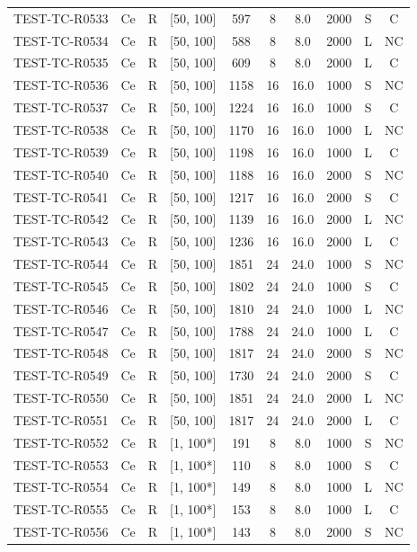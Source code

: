 \begin{longtable}{lccccccccc}
TEST-TC-R0533 & Ce & R & [50, 100] & 597 & 8 & 8.0 & 2000 & S & C \\
TEST-TC-R0534 & Ce & R & [50, 100] & 588 & 8 & 8.0 & 2000 & L & NC \\
TEST-TC-R0535 & Ce & R & [50, 100] & 609 & 8 & 8.0 & 2000 & L & C \\
TEST-TC-R0536 & Ce & R & [50, 100] & 1158 & 16 & 16.0 & 1000 & S & NC \\
TEST-TC-R0537 & Ce & R & [50, 100] & 1224 & 16 & 16.0 & 1000 & S & C \\
TEST-TC-R0538 & Ce & R & [50, 100] & 1170 & 16 & 16.0 & 1000 & L & NC \\
TEST-TC-R0539 & Ce & R & [50, 100] & 1198 & 16 & 16.0 & 1000 & L & C \\
TEST-TC-R0540 & Ce & R & [50, 100] & 1188 & 16 & 16.0 & 2000 & S & NC \\
TEST-TC-R0541 & Ce & R & [50, 100] & 1217 & 16 & 16.0 & 2000 & S & C \\
TEST-TC-R0542 & Ce & R & [50, 100] & 1139 & 16 & 16.0 & 2000 & L & NC \\
TEST-TC-R0543 & Ce & R & [50, 100] & 1236 & 16 & 16.0 & 2000 & L & C \\
TEST-TC-R0544 & Ce & R & [50, 100] & 1851 & 24 & 24.0 & 1000 & S & NC \\
TEST-TC-R0545 & Ce & R & [50, 100] & 1802 & 24 & 24.0 & 1000 & S & C \\
TEST-TC-R0546 & Ce & R & [50, 100] & 1810 & 24 & 24.0 & 1000 & L & NC \\
TEST-TC-R0547 & Ce & R & [50, 100] & 1788 & 24 & 24.0 & 1000 & L & C \\
TEST-TC-R0548 & Ce & R & [50, 100] & 1817 & 24 & 24.0 & 2000 & S & NC \\
TEST-TC-R0549 & Ce & R & [50, 100] & 1730 & 24 & 24.0 & 2000 & S & C \\
TEST-TC-R0550 & Ce & R & [50, 100] & 1851 & 24 & 24.0 & 2000 & L & NC \\
TEST-TC-R0551 & Ce & R & [50, 100] & 1817 & 24 & 24.0 & 2000 & L & C \\
TEST-TC-R0552 & Ce & R & [1, 100*] & 191 & 8 & 8.0 & 1000 & S & NC \\
TEST-TC-R0553 & Ce & R & [1, 100*] & 110 & 8 & 8.0 & 1000 & S & C \\
TEST-TC-R0554 & Ce & R & [1, 100*] & 149 & 8 & 8.0 & 1000 & L & NC \\
TEST-TC-R0555 & Ce & R & [1, 100*] & 153 & 8 & 8.0 & 1000 & L & C \\
TEST-TC-R0556 & Ce & R & [1, 100*] & 143 & 8 & 8.0 & 2000 & S & NC \\

\end{longtable}
